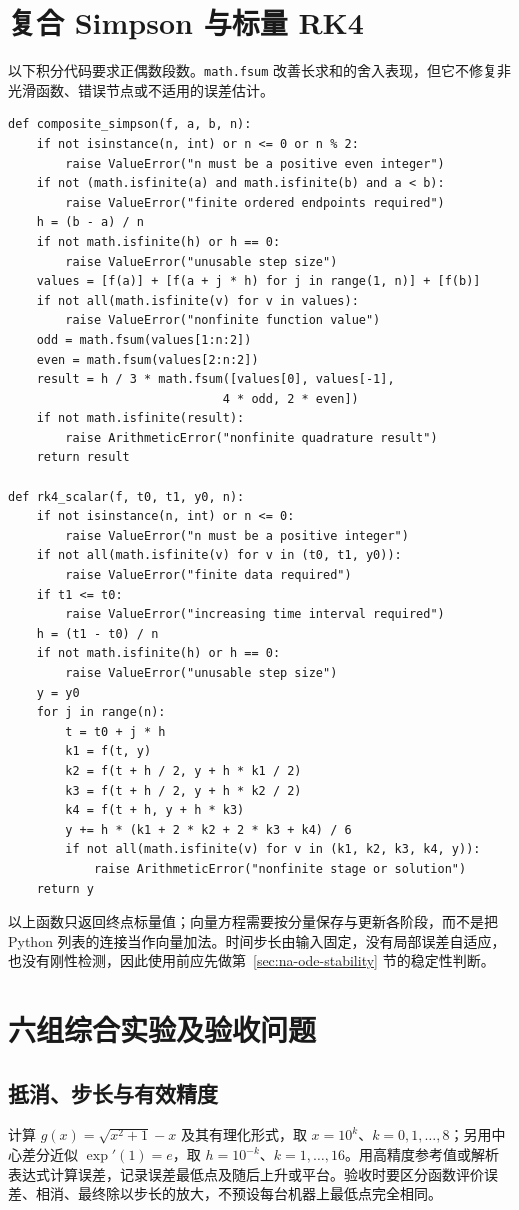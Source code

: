 \section{复合 Simpson 与标量 RK4}
以下积分代码要求正偶数段数。\texttt{math.fsum} 改善长求和的舍入表现，但它不修复非光滑函数、错误节点或不适用的误差估计。
\begin{verbatim}
def composite_simpson(f, a, b, n):
    if not isinstance(n, int) or n <= 0 or n % 2:
        raise ValueError("n must be a positive even integer")
    if not (math.isfinite(a) and math.isfinite(b) and a < b):
        raise ValueError("finite ordered endpoints required")
    h = (b - a) / n
    if not math.isfinite(h) or h == 0:
        raise ValueError("unusable step size")
    values = [f(a)] + [f(a + j * h) for j in range(1, n)] + [f(b)]
    if not all(math.isfinite(v) for v in values):
        raise ValueError("nonfinite function value")
    odd = math.fsum(values[1:n:2])
    even = math.fsum(values[2:n:2])
    result = h / 3 * math.fsum([values[0], values[-1],
                              4 * odd, 2 * even])
    if not math.isfinite(result):
        raise ArithmeticError("nonfinite quadrature result")
    return result

def rk4_scalar(f, t0, t1, y0, n):
    if not isinstance(n, int) or n <= 0:
        raise ValueError("n must be a positive integer")
    if not all(math.isfinite(v) for v in (t0, t1, y0)):
        raise ValueError("finite data required")
    if t1 <= t0:
        raise ValueError("increasing time interval required")
    h = (t1 - t0) / n
    if not math.isfinite(h) or h == 0:
        raise ValueError("unusable step size")
    y = y0
    for j in range(n):
        t = t0 + j * h
        k1 = f(t, y)
        k2 = f(t + h / 2, y + h * k1 / 2)
        k3 = f(t + h / 2, y + h * k2 / 2)
        k4 = f(t + h, y + h * k3)
        y += h * (k1 + 2 * k2 + 2 * k3 + k4) / 6
        if not all(math.isfinite(v) for v in (k1, k2, k3, k4, y)):
            raise ArithmeticError("nonfinite stage or solution")
    return y
\end{verbatim}
以上函数只返回终点标量值；向量方程需要按分量保存与更新各阶段，而不是把 Python 列表的连接当作向量加法。时间步长由输入固定，没有局部误差自适应，也没有刚性检测，因此使用前应先做第~\ref{sec:na-ode-stability} 节的稳定性判断。

\section{六组综合实验及验收问题}
\subsection{抵消、步长与有效精度}
计算 $g(x)=\sqrt{x^2+1}-x$ 及其有理化形式，取 $x=10^k$、$k=0,1,\ldots,8$；另用中心差分近似 $\exp'(1)=e$，取 $h=10^{-k}$、$k=1,\ldots,16$。用高精度参考值或解析表达式计算误差，记录误差最低点及随后上升或平台。验收时要区分函数评价误差、相消、最终除以步长的放大，不预设每台机器上最低点完全相同。

